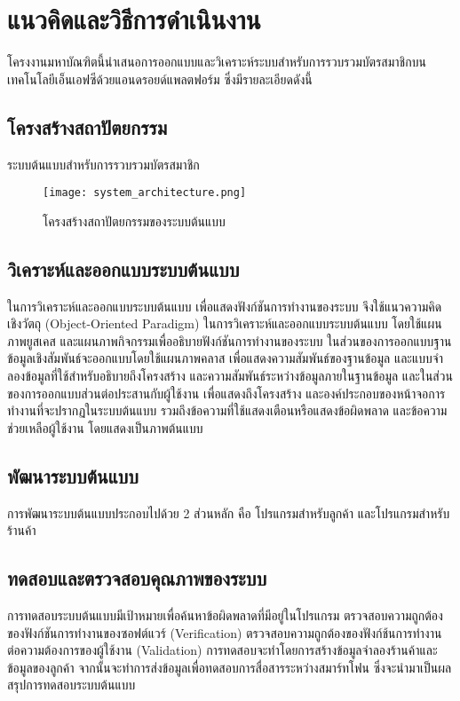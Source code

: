 \documentclass[a4paper]{article}
\begin{document}

\section{แนวคิดและวิธีการดำเนินงาน}
โครงงานมหาบัณฑิตนี้นําเสนอการออกแบบและวิเคราะห์ระบบสำหรับการรวบรวมบัตรสมาชิกบนเทคโนโลยีเอ็นเอฟซีด้วยแอนดรอยด์แพลตฟอร์ม ซึ่งมีรายละเอียดดังนี้

\subsection{โครงสร้างสถาปัตยกรรม}
ระบบต้นแบบสำหรับการรวบรวมบัตรสมาชิก
\begin{figure}[ht!]
\centering
\texttt{[image: system\_architecture.png]}
\caption{โครงสร้างสถาปัตยกรรมของระบบต้นแบบ}
\label{overflow}
\end{figure}

\subsection{วิเคราะห์และออกแบบระบบต้นแบบ}
ในการวิเคราะห์และออกแบบระบบต้นแบบ เพื่อแสดงฟังก์ชันการทำงานของระบบ จึงใช้แนวความคิดเชิงวัตถุ (Object-Oriented Paradigm) ในการวิเคราะห์และออกแบบระบบต้นแบบ โดยใช้แผนภาพยูสเคส และแผนภาพกิจกรรมเพื่ออธิบายฟังก์ชันการทํางานของระบบ ในส่วนของการออกแบบฐานข้อมูลเชิงสัมพันธ์จะออกแบบโดยใช้แผนภาพคลาส เพื่อแสดงความสัมพันธ์ของฐานข้อมูล และแบบจําลองข้อมูลที่ใช้สําหรับอธิบายถึงโครงสร้าง และความสัมพันธ์ระหว่างข้อมูลภายในฐานข้อมูล และในส่วนของการออกแบบส่วนต่อประสานกับผู้ใช้งาน เพื่อแสดงถึงโครงสร้าง และองค์ประกอบของหน้าจอการทํางานที่จะปรากฏในระบบต้นแบบ รวมถึงข้อความที่ใช้แสดงเตือนหรือแสดงข้อผิดพลาด และข้อความช่วยเหลือผู้ใช้งาน โดยแสดงเป็นภาพต้นแบบ

\subsection{พัฒนาระบบต้นแบบ}
การพัฒนาระบบต้นแบบประกอบไปด้วย 2 ส่วนหลัก คือ โปรแกรมสำหรับลูกค้า และโปรแกรมสำหรับร้านค้า

\subsection{ทดสอบและตรวจสอบคุณภาพของระบบ}
การทดสอบระบบต้นแบบมีเป้าหมายเพื่อค้นหาข้อผิดพลาดที่มีอยู่ในโปรแกรม ตรวจสอบความถูกต้องของฟังก์ชันการทำงานของซอฟต์แวร์ (Verification) ตรวจสอบความถูกต้องของฟังก์ช้นการทํางานต่อความต้องการของผู้ใช้งาน (Validation) การทดสอบจะทำโดยการสร้างข้อมูลจำลองร้านค้าและข้อมูลของลูกค้า จากนั้นจะทำการส่งข้อมูลเพื่อทดสอบการสื่อสารระหว่างสมาร์ทโฟน ซึ่งจะนํามาเป็นผลสรุปการทดสอบระบบต้นแบบ
\end{document}
